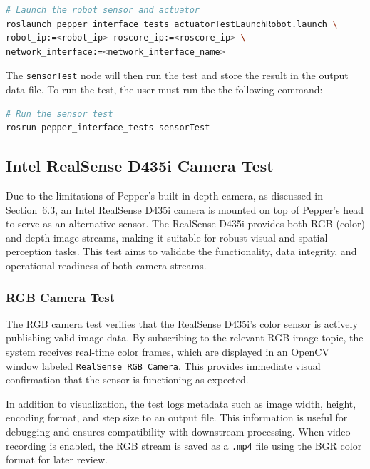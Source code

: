\documentclass{CSSRforAfrica}
\begin{document}
\begin{lstlisting}[style=withoutNumbering, language=bash]
# Launch the robot sensor and actuator
roslaunch pepper_interface_tests actuatorTestLaunchRobot.launch \
robot_ip:=<robot_ip> roscore_ip:=<roscore_ip> \
network_interface:=<network_interface_name>
\end{lstlisting}

The \texttt{sensorTest} node will then run the test and store the result in the output data file. To run the test, the user must run the
the following command:

\begin{lstlisting}[style=withoutNumbering, language=bash]
# Run the sensor test
rosrun pepper_interface_tests sensorTest
\end{lstlisting}

\subsection{Intel RealSense D435i Camera Test}

Due to the limitations of Pepper's built-in depth camera, as discussed in Section~6.3, an Intel RealSense D435i camera is mounted on top of Pepper's head to serve as an alternative sensor. The RealSense D435i provides both RGB (color) and depth image streams, making it suitable for robust visual and spatial perception tasks. This test aims to validate the functionality, data integrity, and operational readiness of both camera streams.

\subsubsection*{RGB Camera Test}

The RGB camera test verifies that the RealSense D435i’s color sensor is actively publishing valid image data. By subscribing to the relevant RGB image topic, the system receives real-time color frames, which are displayed in an OpenCV window labeled \texttt{RealSense RGB Camera}. This provides immediate visual confirmation that the sensor is functioning as expected.

In addition to visualization, the test logs metadata such as image width, height, encoding format, and step size to an output file. This information is useful for debugging and ensures compatibility with downstream processing. When video recording is enabled, the RGB stream is saved as a \texttt{.mp4} file using the BGR color format for later review.
\end{document}
